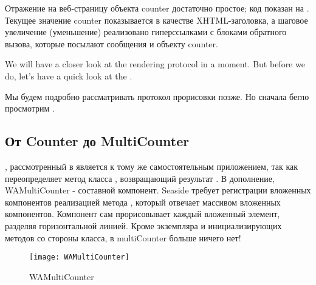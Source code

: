 \documentclass[a4paper,10pt,twoside]{book}
\begin{document}
Отражение на веб-страницу объекта counter достаточно простое; код показан на .
Текущее значение counter показывается в качестве XHTML-заголовка,
а шаговое увеличение (уменьшение) реализовано гиперссылками с
блоками обратного вызова,
которые посылают сообщения  и  объекту counter.

We will have a closer look at the rendering protocol in a moment.
But before we do, let's have a quick look at the .

Мы будем подробно рассматривать протокол прорисовки позже.
Но сначала бегло просмотрим .


\subsection{От Counter до MultiCounter}


, рассмотренный в  является к тому же
самостоятельным приложением, так как
переопределяет метод класса ,
возвращающий результат .
В дополнение, WAMultiCounter - составной компонент.
Seaside требует регистрации вложенных компонентов реализацией метода ,
который отвечает массивом вложенных компонентов.
Компонент сам прорисовывает каждый вложенный элемент, разделяя горизонтальной линией.
Кроме экземпляра и инициализирующих методов со стороны класса,
в multiCounter больше ничего нет!

\begin{figure}[bht]
\begin{center}
\texttt{[image: WAMultiCounter]}
\caption{WAMultiCounter}
\end{center}
\end{figure}
\end{document}
